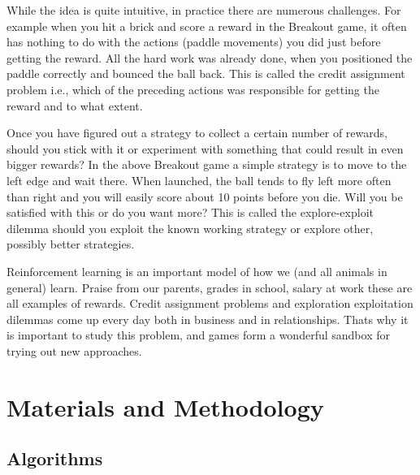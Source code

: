 \documentclass[a4paper,11pt]{report}
\begin{document}
			While the idea is quite intuitive, in practice there are numerous challenges. For example when you hit a brick and score a reward in the Breakout game, it often has nothing to do with the actions (paddle movements) you did just before getting the reward. All the hard work was already done, when you positioned the paddle correctly and bounced the ball back. This is called the credit assignment problem i.e., which of the preceding actions was responsible for getting the reward and to what extent.

			Once you have figured out a strategy to collect a certain number of rewards, should you stick with it or experiment with something that could result in even bigger rewards? In the above Breakout game a simple strategy is to move to the left edge and wait there. When launched, the ball tends to fly left more often than right and you will easily score about 10 points before you die. Will you be satisfied with this or do you want more? This is called the explore-exploit dilemma should you exploit the known working strategy or explore other, possibly better strategies.

			Reinforcement learning is an important model of how we (and all animals in general) learn. Praise from our parents, grades in school, salary at work these are all examples of rewards. Credit assignment problems and exploration exploitation dilemmas come up every day both in business and in relationships. Thats why it is important to study this problem, and games form a wonderful sandbox for trying out new approaches.

	\chapter{Materials and Methodology}
		\section{Algorithms}
\end{document}
